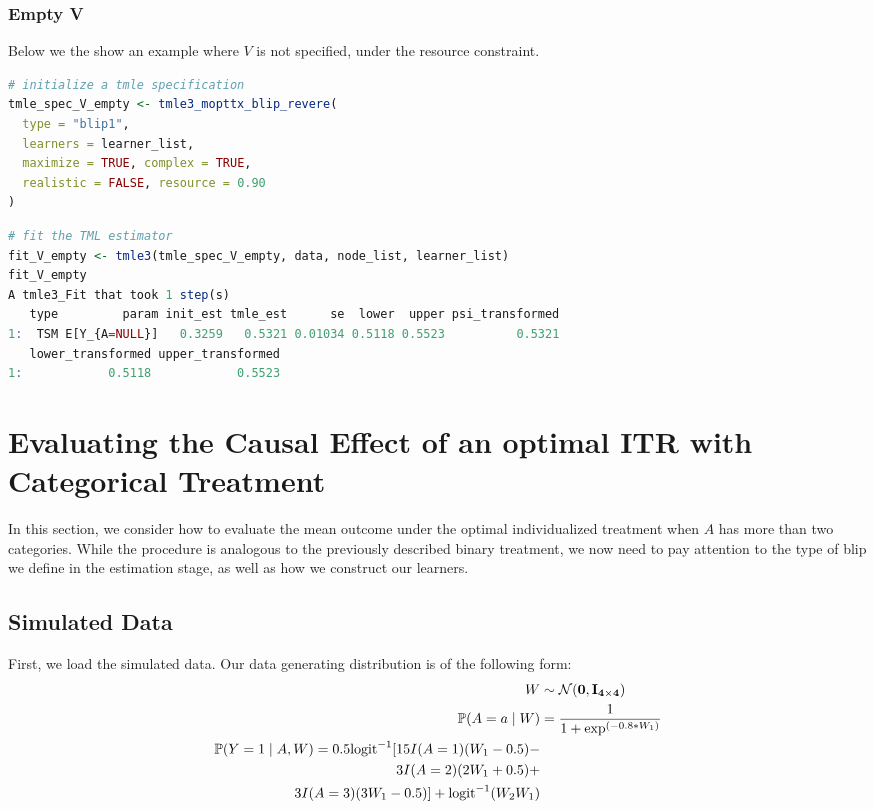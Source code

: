 \documentclass[
  12pt, krantz2,
]{krantz}
\renewcommand{\P}{\mathbb{P}}
\newcommand{\1}{\mathbbm{1}}
\theoremstyle{definition}
\theoremstyle{definition}
\theoremstyle{definition}
\theoremstyle{definition}
\theoremstyle{remark}
\begin{document}
\hypertarget{empty-v}{%
\subsubsection{Empty V}\label{empty-v}}

Below we the show an example where \(V\) is not specified, under the
resource constraint.

\begin{lstlisting}[language=R]
# initialize a tmle specification
tmle_spec_V_empty <- tmle3_mopttx_blip_revere(
  type = "blip1",
  learners = learner_list,
  maximize = TRUE, complex = TRUE,
  realistic = FALSE, resource = 0.90
)
\end{lstlisting}

\begin{lstlisting}[language=R]
# fit the TML estimator
fit_V_empty <- tmle3(tmle_spec_V_empty, data, node_list, learner_list)
fit_V_empty
A tmle3_Fit that took 1 step(s)
   type         param init_est tmle_est      se  lower  upper psi_transformed
1:  TSM E[Y_{A=NULL}]   0.3259   0.5321 0.01034 0.5118 0.5523          0.5321
   lower_transformed upper_transformed
1:            0.5118            0.5523
\end{lstlisting}

\hypertarget{oit-eval-cat}{%
\section{Evaluating the Causal Effect of an optimal ITR with Categorical Treatment}\label{oit-eval-cat}}

In this section, we consider how to evaluate the mean outcome under the optimal
individualized treatment when \(A\) has more than two categories. While the
procedure is analogous to the previously described binary treatment, we now need
to pay attention to the type of blip we define in the estimation stage, as well
as how we construct our learners.

\hypertarget{simulated-data-1}{%
\subsection{Simulated Data}\label{simulated-data-1}}

First, we load the simulated data. Our data generating distribution is
of the following form:
\begin{align*}
  W &\sim \mathcal{N}(\bf{0},I_{4 \times 4})\\
  \P(A=a \mid W) &= \frac{1}{1+\exp^{(-0.8*W_1)}}\\
  \P(Y=1 \mid A,W) = 0.5\text{logit}^{-1}[15I(A=1)(W_1-0.5) - \\
    3I(A=2)(2W_1+0.5) + \\
    3I(A=3)(3W_1-0.5)] +\text{logit}^{-1}(W_2W_1) \\
\end{align*}
\end{document}

